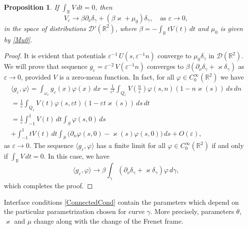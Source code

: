 \documentclass[reqno]{amsart}
\theoremstyle{plain}
\newtheorem{prop}{Proposition}
\numberwithin{equation}{section}
\renewcommand{\kappa}{\varkappa}
\newcommand{\Real}{\mathbb R}
\newcommand{\eps}{\varepsilon}
\renewcommand{\phi}{\varphi}
\begin{document}
\begin{prop}\label{PropVepsConverg}
If $\int_\Real V\,dt=0$, then
\begin{equation*}
   V_\eps\to \beta\partial_\nu\delta_\gamma+\left(\beta\kappa+\mu_0\right) \delta_\gamma,\quad \mbox{as } \eps\to 0,
\end{equation*}
in the space of distributions $\mathcal{D}'(\Real^2)$, where
$\beta=-\int_\Real t V(t)\,dt$ and $\mu_0$ is given by \eqref{Mu0}.
\end{prop}
\begin{proof}
It is evident that potentials $\eps^{-1}\,U\left(s,\eps^{-1}n\right)$
converge to $\mu_0 \delta_\gamma$ in $\mathcal{D}(\Real^2)$.
We will prove that sequence $g_\eps=\eps^{-2}\,V\left(\eps^{-1}n\right)$ converges to
$\beta\left(\partial_\nu\delta_\gamma+\kappa\delta_\gamma\right)$ as $\eps\to 0$, provided $V$ is a zero-mean function.
In fact, for all $\phi\in C^\infty_0(\Real^2)$ we have
\begin{multline*}
\langle g_\eps, \phi \rangle=\int_{\omega_\eps}g_\eps(x)\phi(x)\,dx
=
\frac{1}{\eps^2}\int_{Q_\eps} V\left(\frac{n}{\eps}\right)\phi(s,n)(1-n\kappa(s))\,ds\,dn
\\
 =
\frac{1}{\eps}\int_{Q_1} V(t)\phi(s,\eps t)(1-\eps t\kappa(s))\,ds\,dt
\\
=\frac{1}{\eps}\int_{-1}^1 V(t)\,dt \int_S\phi(s,0)\,ds
\\
+
\int_{-1}^1 t V(t)\,dt \int_S\big(\partial_n\phi(s,0)-\kappa(s)\phi(s,0)\big)\,ds+O(\eps),
\end{multline*}
as $\eps\to 0$.
The sequence $\langle g_\eps, \phi \rangle$ has a finite limit for all $\phi\in C^\infty_0(\Real^2)$ if and only if $\int_\Real V\,dt=0$.
In this case, we have
\begin{equation*}
\langle g_\eps, \phi \rangle\to \beta\int_\gamma\left(\partial_\nu\delta_\gamma+\kappa \delta_\gamma\right)\phi\,d\gamma,
\end{equation*}
which completes the proof.
\end{proof}

Interface conditions \eqref{ConnectedCond} contain the parameters which depend on the particular parametrization chosen for curve $\gamma$. More precisely, parameters $\theta$, $\kappa$ and $\mu$ change along with the change of the Frenet frame.
\end{document}
